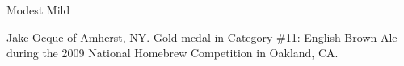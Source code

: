 \documentclass[parskip=half,fontsize=9pt,oneside]{scrbook}
\begin{document}
\mainmatter


\begin{recipe}{Modest Mild}

\begin{aboutblock}
Jake Ocque of Amherst, NY. Gold medal in Category \#11: English Brown Ale during
the 2009 National Homebrew Competition in Oakland, CA.
\sourceaha
\end{aboutblock}


\begin{methodandtiming}

\begin{mashsteps}
\end{mashsteps}

\begin{fermentationsteps}
\end{fermentationsteps}

\end{methodandtiming}

\recipebreak

\begin{ingredientsblock}

\begin{malts}
\end{malts}

\begin{hops}
\end{hops}


\end{ingredientsblock}

\end{recipe}


\end{document}
